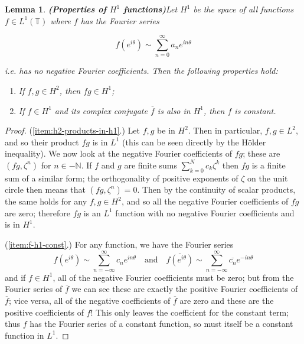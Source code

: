 \documentclass{article}
\newcommand{\1}{\mathbf{1}}
\newtheorem{lemma}[theorem]{Lemma}
\begin{document}
\begin{lemma}{\textbf{(Properties of $H^1$ functions)}}\label{thm:h1-properties}
Let $H^1$ be the space of all functions $f \in L^1(\mathbb{T})$ where $f$ has the Fourier series

$$f(e^{i \theta}) \sim \sum_{n=0}^\infty a_n e^{i n \theta}$$

i.e. has no negative Fourier coefficients. Then the following properties hold:
\begin{enumerate}
\item\label{item:h2-products-in-h1} If $f, g \in H^2$, then $fg \in H^1$;
\item\label{item:f-h1-const} If $f \in H^1$ and its complex conjugate $\overline{f}$ is also in $H^1$, then $f$ is constant.
\end{enumerate}
\end{lemma}
\begin{proof}
(\ref{item:h2-products-in-h1}.) Let $f, g$ be in $H^2$. Then in particular, $f, g \in L^2$, and so their product $fg$ is in $L^1$ (this can be seen directly by the H\"older inequality). We now look at the negative Fourier coefficients of
$fg$; these are $(fg, \zeta^n)$ for $n \in -\mathbb{N}$. If $f$ and $g$ are finite sums $\sum_{k=0}^N c_k \zeta^k$ then $fg$ is a finite sum of a similar 
form; the orthogonality of positive exponents of $\zeta$ on the unit circle then means that $(fg, \zeta^n) = 0$. Then by the continuity of scalar products,
the same holds for any $f, g \in H^2$, and so all the negative Fourier coefficients of $fg$ are zero; therefore $fg$ is an $L^1$ function with no negative 
Fourier coefficients and is in $H^1$.

(\ref{item:f-h1-const}.) For any function, we have the Fourier series
\begin{equation*}
f(e^{i \theta}) \sim \sum_{n=-\infty}^\infty c_n e^{i n \theta} \quad\text{and}\quad \overline{f(e^{i \theta})} \sim \sum_{n=-\infty}^\infty \overline{c_n} e^{-i n \theta}
\end{equation*}
and if $f \in H^1$, all of the negative Fourier coefficients must be zero; but from the Fourier series of $\overline{f}$ we can see these are exactly
the positive Fourier coefficients of $\overline{f}$; vice versa, all of the negative coefficients of $\overline{f}$ are zero and these are the positive
coefficients of $f$! This only leaves the coefficient for the constant term; thus $f$ has the Fourier series of a constant function, so must itself
be a constant function in $L^1$.
\end{proof}
\end{document}
